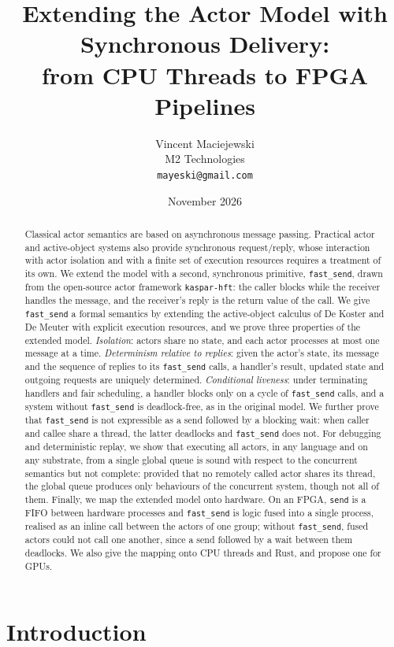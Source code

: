 \documentclass[11pt]{article}
\title{Extending the Actor Model with Synchronous Delivery:\\
\fs{} from CPU Threads to FPGA Pipelines}
\author{Vincent Maciejewski\\M2 Technologies\\\texttt{mayeski@gmail.com}}
\date{November 2026}
\theoremstyle{definition}
\theoremstyle{remark}
\newcommand{\fs}{\texttt{fast\_send}}
\newcommand{\snd}{\texttt{send}}
\newcommand{\kh}{\texttt{kaspar-hft}}
\begin{document}
\maketitle

\begin{abstract}
Classical actor semantics are based on asynchronous message passing. Practical actor
and active-object systems also provide synchronous request/reply, whose interaction with
actor isolation and with a finite set of execution resources requires a treatment of its
own. We extend the model with a
second, synchronous primitive, \fs{}, drawn from the open-source actor framework \kh{}:
the caller blocks while the receiver handles the message, and the receiver's reply is the
return value of the call. We give \fs{} a formal semantics by extending the active-object
calculus of De Koster and De Meuter with explicit execution resources, and we prove three
properties of the extended model. \emph{Isolation}: actors share no state, and each actor
processes at most one message at a time. \emph{Determinism relative to replies}: given the actor's state, its message and the
sequence of replies to its \fs{} calls, a handler's result, updated state and outgoing
requests are uniquely determined.
\emph{Conditional liveness}: under terminating handlers and fair scheduling, a handler
blocks only on a cycle of \fs{} calls, and a system without \fs{} is deadlock-free, as in
the original model. We further prove that \fs{} is not expressible as a send followed by
a blocking wait: when caller and callee share a thread, the latter deadlocks and \fs{}
does not. For debugging and deterministic replay, we show that executing all actors, in
any language and on any substrate, from a single global queue is sound with respect to
the concurrent semantics but not complete: provided that no remotely called actor shares
its thread, the global queue produces only behaviours of the concurrent system, though
not all of them. Finally, we map the extended model onto hardware. On an FPGA, \snd{} is
a FIFO between hardware processes and \fs{} is logic fused into a single process, realised
as an inline call between the actors of one group; without \fs{}, fused actors could not
call one another, since a send followed by a wait between them deadlocks. We also give
the mapping onto CPU threads and Rust, and propose one for GPUs.
\end{abstract}

\section{Introduction}
\end{document}
